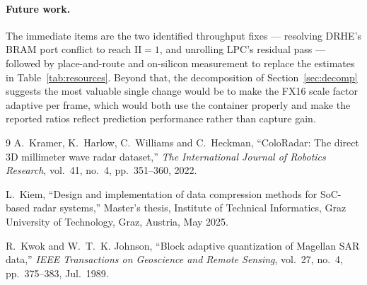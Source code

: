 \documentclass[10pt,twocolumn]{article}
\begin{document}
\paragraph{Future work.}
The immediate items are the two identified throughput fixes --- resolving
DRHE's BRAM port conflict to reach $\mathrm{II}=1$, and unrolling LPC's
residual pass --- followed by place-and-route and on-silicon measurement to
replace the estimates in Table~\ref{tab:resources}. Beyond that, the
decomposition of Section~\ref{sec:decomp} suggests the most valuable single
change would be to make the FX16 scale factor adaptive per frame, which would
both use the container properly and make the reported ratios reflect prediction
performance rather than capture gain.

\begin{thebibliography}{9}
\small
{}
A.~Kramer, K.~Harlow, C.~Williams and C.~Heckman,
``ColoRadar: The direct 3D millimeter wave radar dataset,''
\emph{The International Journal of Robotics Research}, vol.~41, no.~4,
pp.~351--360, 2022.

L.~Kiem, ``Design and implementation of data compression methods for SoC-based
radar systems,'' Master's thesis, Institute of Technical Informatics,
Graz University of Technology, Graz, Austria, May 2025.

R.~Kwok and W.~T.~K. Johnson, ``Block adaptive quantization of Magellan SAR
data,'' \emph{IEEE Transactions on Geoscience and Remote Sensing}, vol.~27,
no.~4, pp.~375--383, Jul.~1989.

\end{thebibliography}

\balance
\end{document}
